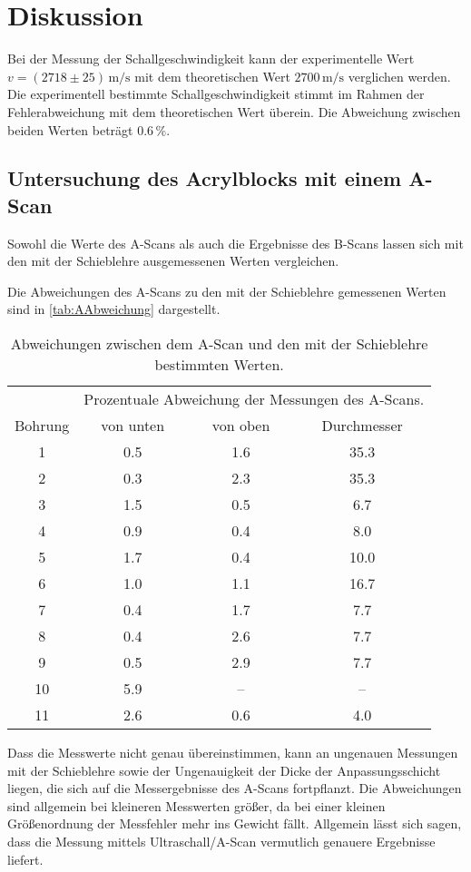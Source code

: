 \section{Diskussion}
\label{sec:Diskussion}

Bei der Messung der Schallgeschwindigkeit kann der experimentelle Wert $v = (2718\pm 25) \, \unit{\m\per\s}$ mit dem theoretischen Wert 
$2700 \,\unit{\m\per\s}$ verglichen werden. Die experimentell bestimmte Schallgeschwindigkeit stimmt im Rahmen der Fehlerabweichung mit 
dem theoretischen Wert überein. Die Abweichung zwischen beiden Werten beträgt $0.6\,\%$. 

\subsection{Untersuchung des Acrylblocks mit einem A-Scan}
Sowohl die Werte des A-Scans als auch die Ergebnisse des B-Scans lassen sich mit den mit der Schieblehre ausgemessenen Werten %
vergleichen.

Die Abweichungen des A-Scans zu den mit der Schieblehre gemessenen Werten sind in \autoref{tab:AAbweichung} dargestellt. 

\begin{table}
    \centering 
    \caption{Abweichungen zwischen dem A-Scan und den mit der Schieblehre bestimmten Werten.}
\begin{tabular}{c c c c}
    \toprule
    & \multicolumn{3}{c}{Prozentuale Abweichung der Messungen des A-Scans.} \\
    Bohrung & von unten & von oben & Durchmesser\\
    \midrule
    1&0.5&1.6&35.3 \\
    2&0.3&2.3&35.3 \\
     3&1.5&0.5&6.7 \\
     4&0.9&0.4&8.0 \\
    5&1.7&0.4&10.0 \\
    6&1.0&1.1&16.7 \\
     7&0.4&1.7&7.7 \\
     8&0.4&2.6&7.7 \\
     9&0.5&2.9&7.7 \\
    10&5.9&--&-- \\
    11&2.6&0.6&4.0 \\
    \bottomrule
\end{tabular}
\label{tab:AAbweichung}
\end{table}
Dass die Messwerte nicht genau übereinstimmen, kann an ungenauen Messungen mit der Schieblehre sowie der Ungenauigkeit der Dicke der Anpassungsschicht 
liegen, die sich auf die Messergebnisse des A-Scans fortpflanzt. Die Abweichungen sind allgemein bei kleineren Messwerten größer, da bei einer kleinen 
Größenordnung der Messfehler mehr ins Gewicht fällt. Allgemein lässt sich sagen, dass die Messung mittels Ultraschall/A-Scan vermutlich genauere Ergebnisse 
liefert.

